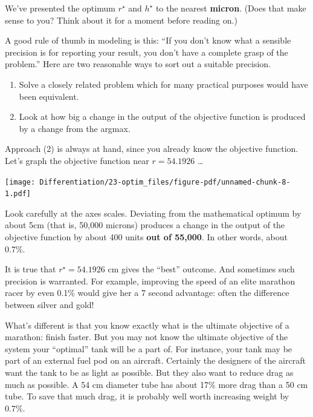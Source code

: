 \documentclass[
  letterpaper,
  DIV=11,
  numbers=noendperiod,
  oneside]{scrreprt}
\providecommand{\tightlist}{%
  \setlength{\itemsep}{0pt}\setlength{\parskip}{0pt}}
\begin{document}
We've presented the optimum \(r^\star\) and \(h^\star\) to the nearest
\textbf{micron}. (Does that make sense to you? Think about it for a
moment before reading on.)

A good rule of thumb in modeling is this: ``If you don't know what a
sensible precision is for reporting your result, you don't have a
complete grasp of the problem.'' Here are two reasonable ways to sort
out a suitable precision.

\begin{enumerate}
\def\labelenumi{\arabic{enumi}.}
\tightlist
\item
  Solve a closely related problem which for many practical purposes
  would have been equivalent.
\item
  Look at how big a change in the output of the objective function is
  produced by a change from the argmax.
\end{enumerate}

Approach (2) is always at hand, since you already know the objective
function. Let's graph the objective function near \(r = 54.1926\)
\ldots{}

\begin{marginfigure}

{\centering \texttt{[image: Differentiation/23-optim\_files/figure-pdf/unnamed-chunk-8-1.pdf]}

}

\end{marginfigure}

Look carefully at the axes scales. Deviating from the mathematical
optimum by about 5cm (that is, 50,000 microns) produces a change in the
output of the objective function by about 400 units \textbf{out of
55,000}. In other words, about 0.7\%.

It is true that \(r^\star = 54.1926\) cm gives the ``best'' outcome. And
sometimes such precision is warranted. For example, improving the speed
of an elite marathon racer by even 0.1\% would give her a 7 second
advantage: often the difference between silver and gold!

What's different is that you know exactly what is the ultimate objective
of a marathon: finish faster. But you may not know the ultimate
objective of the system your ``optimal'' tank will be a part of. For
instance, your tank may be part of an external fuel pod on an aircraft.
Certainly the designers of the aircraft want the tank to be as light as
possible. But they also want to reduce drag as much as possible. A 54 cm
diameter tube has about 17\% more drag than a 50 cm tube. To save that
much drag, it is probably well worth increasing weight by 0.7\%.
\end{document}
